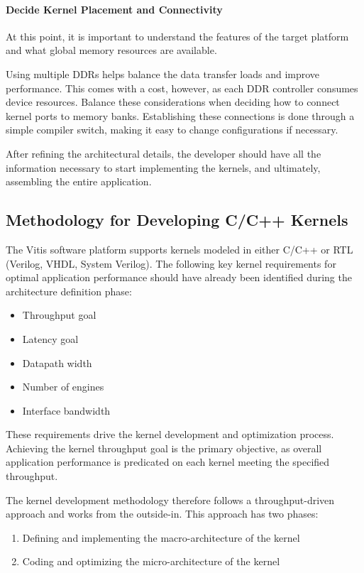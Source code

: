 \paragraph{Decide Kernel Placement and Connectivity}
At this point, it is important to understand the features of the target platform and what global memory resources are available.

\par Using multiple DDRs helps balance the data transfer loads and improve performance. This comes with a cost, however, as each DDR controller consumes device resources. Balance these considerations when deciding how to connect kernel ports to memory banks. Establishing these connections is done through a simple compiler switch, making it easy to change configurations if necessary.

\par After refining the architectural details, the developer should have all the information necessary to start implementing the kernels, and ultimately, assembling the entire application.


\clearpage
\subsection{Methodology for Developing C/C++ Kernels}
The Vitis software platform supports kernels modeled in either C/C++ or RTL (Verilog, VHDL, System Verilog). The following key kernel requirements for optimal application performance should have already been identified during the architecture definition phase:
\begin{itemize}
    \item Throughput goal
    \item Latency goal
    \item Datapath width
    \item Number of engines
    \item Interface bandwidth
\end{itemize}

These requirements drive the kernel development and optimization process. Achieving the kernel throughput goal is the primary objective, as overall application performance is predicated on each kernel meeting the specified throughput.

\par The kernel development methodology therefore follows a throughput-driven approach and works from the outside-in. This approach has two phases:
\begin{enumerate}
    \item Defining and implementing the macro-architecture of the kernel
    \item Coding and optimizing the micro-architecture of the kernel
\end{enumerate}

